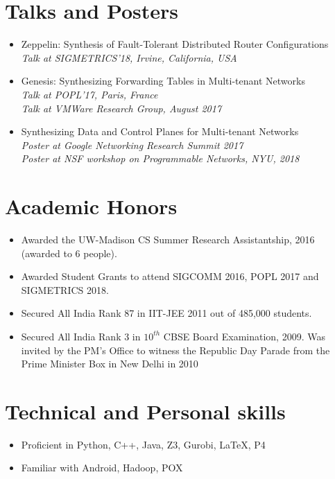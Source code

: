 \documentclass[11pt,a4paper,sans]{moderncv}        %
\begin{document}
\vspace{2pt}

\section{Talks and Posters}
\begin{itemize}
\item Zeppelin: Synthesis of Fault-Tolerant Distributed Router Configurations \\
\emph{Talk at SIGMETRICS'18, Irvine, California, USA}

\item Genesis: Synthesizing Forwarding Tables in Multi-tenant Networks \\
\emph{Talk at POPL'17, Paris, France} \\
\emph{Talk at VMWare Research Group, August 2017}

\item Synthesizing Data and Control Planes for Multi-tenant Networks \\
\emph{Poster at Google Networking Research Summit 2017} \\
\emph{Poster at NSF workshop on Programmable Networks, NYU, 2018}
\end{itemize}
\section{Academic  Honors}
\begin{itemize}
\item{Awarded the UW-Madison CS Summer Research Assistantship, 2016 (awarded to 6 people).}
\item{Awarded Student Grants to attend SIGCOMM 2016, POPL 2017 and SIGMETRICS 2018.}
\item{Secured All India Rank 87 in IIT-JEE 2011 out of 485,000 students.}
\item{Secured All India Rank 3 in $10^{th}$ CBSE Board Examination, 2009. Was invited by the PM's Office to witness the Republic Day Parade from the Prime Minister Box in New Delhi in 2010}
\end{itemize}

\section{Technical and Personal skills}
\begin{itemize}
\item Proficient in Python, C++, Java, Z3, Gurobi, \LaTeX, P4
\item Familiar with Android, Hadoop, POX
\end{itemize}
\end{document}
